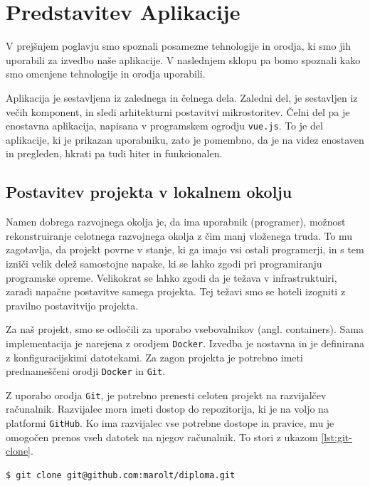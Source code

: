 \documentclass[a4paper, 12pt]{book}
\begin{document}
\newpage
\chapter{Predstavitev Aplikacije}
V prejšnjem poglavju smo spoznali posamezne tehnologije in orodja, ki smo jih uporabili za izvedbo naše aplikacije. V naslednjem sklopu pa bomo spoznali kako smo omenjene tehnologije in orodja uporabili. 

Aplikacija je sestavljena iz zalednega in čelnega dela. Zaledni del, je sestavljen iz večih komponent, in sledi arhitekturni postavitvi mikrostoritev. Čelni del pa je enostavna aplikacija, napisana v programskem ogrodju \verb=vue.js=. To je del aplikacije, ki je prikazan uporabniku, zato je pomembno, da je na videz enostaven in pregleden, hkrati pa tudi hiter in funkcionalen. 



\section{Postavitev projekta v lokalnem okolju}

Namen dobrega razvojnega okolja je, da ima uporabnik (programer), možnost rekonstruiranje celotnega razvojnega okolja z čim manj vloženega truda. To mu zagotavlja, da projekt povrne v stanje, ki ga imajo vsi ostali programerji, in s tem izniči velik delež samostojne napake, ki se lahko zgodi pri programiranju programske opreme. Velikokrat se lahko zgodi da je težava v infrastruktuiri, zaradi napačne postavitve samega projekta. Tej težavi smo se hoteli izogniti z pravilno postavitvijo projekta.

Za naš projekt, smo se odločili za uporabo vsebovalnikov (angl. containers). Sama implementacija je narejena z orodjem \verb=Docker=. Izvedba je nostavna in je definirana z konfiguracijskimi datotekami. Za zagon projekta je potrebno imeti prednameščeni orodji \verb=Docker= in \verb=Git=.

Z uporabo orodja \verb=Git=, je potrebno prenesti celoten projekt na razvijalčev računalnik. Razvijalec mora imeti dostop do repozitorija, ki je na voljo na platformi \verb=GitHub=. Ko ima razvijalec vse potrebne dostope in pravice, mu je omogočen prenos vseh datotek na njegov računalnik. 
To stori z ukazom \ref{lst:git-clone}.

\begin{lstlisting}[language=bash,style=mystyle,caption={Uporaba orodja Git, za prenos projekta},label=lst:git-clone]
$ git clone git@github.com:marolt/diploma.git
\end{lstlisting}
\end{document}

